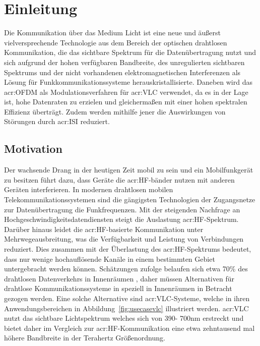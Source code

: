 
\chapter{Einleitung}
\label{sec:introduction}

Die Kommunikation über das Medium Licht ist eine neue und äußerst vielversprechende Technologie aus dem Bereich der optischen drahtlosen Kommunikation, die das sichtbare Spektrum für die Datenübertragung nutzt und sich aufgrund der hohen verfügbaren Bandbreite, des unregulierten sichtbaren Spektrums und der nicht vorhandenen elektromagnetischen Interferenzen als Lösung für Funkkommunikationssysteme herauskristallisierte. Daneben wird das \gls{acr:OFDM} als Modulationsverfahren für \gls{acr:VLC} verwendet, da es in der Lage ist, hohe Datenraten zu erzielen und gleichermaßen mit einer hohen spektralen Effizienz überträgt. Zudem werden mithilfe jener die Auswirkungen von Störungen durch \gls{acr:ISI} reduziert.

\section{Motivation}
\label{sec:motivation}

Der wachsende Drang in der heutigen Zeit mobil zu sein und ein Mobilfunkgerät zu besitzen führt dazu, dass Geräte die \gls{acr:HF}-bänder nutzen mit anderen Geräten interferieren. In modernen drahtlosen mobilen Telekommunikationssystemen sind die gängigsten Technologien der Zugangsnetze zur Datenübertragung die Funkfrequenzen. Mit der steigenden Nachfrage an Hochgeschwindigkeitsdatendiensten steigt die Auslastung \gls{acr:HF}-Spektrum. Darüber hinaus leidet die \gls{acr:HF}-basierte Kommunikation unter Mehrwegeausbreitung, was die Verfügbarkeit und Leistung von Verbindungen reduziert. Dies zusammen mit der Überlastung des \gls{acr:HF}-Spektrums bedeutet, dass nur wenige hochauflösende Kanäle in einem bestimmten Gebiet untergebracht werden können. Schätzungen zufolge belaufen sich etwa 70\% des drahtlosen Datenverkehrs in Innenräumen \cite{vlc2}, daher müssen Alternativen für drahtlose Kommunikationssysteme in speziell in Innenräumen in Betracht gezogen werden.
Eine solche Alternative sind \gls{acr:VLC}-Systeme, welche in ihren Anwendungsbereichen in Abbildung~\ref{fig:usecasevlc} illustriert werden. \gls{acr:VLC} nutzt das sichtbare Lichtspektrum  welches sich von 390- 700nm erstreckt und bietet daher im Vergleich zur \gls{acr:HF}-Kommunikation eine etwa zehntausend mal höhere Bandbreite in der Terahertz Größenordnung. 

